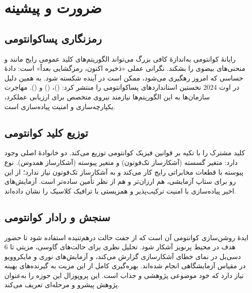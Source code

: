 \section{ضرورت و پیشینه}
\subsection{رمزنگاری پساکوانتومی}
رایانهٔ کوانتومی به‌اندازهٔ کافی بزرگ می‌تواند الگوریتم‌های کلید عمومی رایج مانند  و منحنی‌های بیضوی را بشکند\cite{shor}. نگرانی عملی «ذخیره اکنون، رمزگشایی بعداً» است: دادهٔ حساسی که امروز رهگیری می‌شود، ممکن است در آینده شکسته شود. به همین دلیل  در اوت $2024$ نخستین استانداردهای پساکوانتومی را منتشر کرد:  ()،  () و  ()\cite{nist}. مهاجرت سازمان‌ها به این الگوریتم‌ها نیازمند نیروی متخصص برای ارزیابی عملکرد، یکپارچه‌سازی و امنیت پیاده‌سازی است.

\subsection{توزیع کلید کوانتومی}
 کلید مشترک را با تکیه بر قوانین فیزیک کوانتومی توزیع می‌کند. دو خانوادهٔ اصلی وجود دارد: متغیر گسسته (آشکارساز تک‌فوتون) و متغیر پیوسته (آشکارساز همدوس)\cite{pirandola,weedbrook}. نوع پیوسته با قطعات مخابراتی رایج کار می‌کند و به آشکارساز تک‌فوتون نیاز ندارد\cite{grosshans,diamanti}؛ از این رو برای ستاپ آزمایشی، هم ارزان‌تر و هم از نظر تأمین ساده‌تر است. آزمایش‌های اخیر پیاده‌سازی با امنیت ترکیب‌پذیر و همزیستی با ترافیک کلاسیک را نشان داده‌اند\cite{composable,coexist}.

\subsection{سنجش و رادار کوانتومی}
ایدهٔ روشن‌سازی کوانتومی آن است که از جفت حالت درهم‌تنیده استفاده شود تا حضور هدف در محیط پرنویز آشکار شود\cite{lloyd}. تحلیل نظری برای حالت‌های گاوسی، مزیتی تا $6$ دسی‌بل در نمای خطای آشکارسازی گزارش می‌کند\cite{tan}، و آزمایش‌های نوری و مایکروویو در مقیاس آزمایشگاهی انجام شده‌اند\cite{zhang,barzanjeh}. بهره‌گیری کامل از این مزیت به گیرنده‌های بهینه نیاز دارد که خود موضوعی پژوهشی و جذاب است. این پروپوزال این حوزه را به‌عنوان پژوهش پیشرو و مرحله‌ای تعریف می‌کند.

